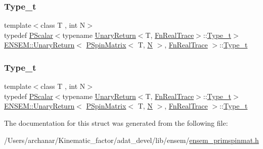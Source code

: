 \subsubsection{\texorpdfstring{Type\_t}{Type\_t}\hspace{0.1cm}{\footnotesize\ttfamily [1/2]}}
{\footnotesize\ttfamily template$<$class T , int N$>$ \\
typedef \mbox{\hyperlink{classENSEM_1_1PScalar}{P\+Scalar}}$<$typename \mbox{\hyperlink{structENSEM_1_1UnaryReturn}{Unary\+Return}}$<$T, \mbox{\hyperlink{structENSEM_1_1FnRealTrace}{Fn\+Real\+Trace}}$>$\+::\mbox{\hyperlink{structENSEM_1_1UnaryReturn_3_01PSpinMatrix_3_01T_00_01N_01_4_00_01FnRealTrace_01_4_a7a7a0fb32831cb5d3323377a17f96cdd}{Type\+\_\+t}}$>$ \mbox{\hyperlink{structENSEM_1_1UnaryReturn}{E\+N\+S\+E\+M\+::\+Unary\+Return}}$<$ \mbox{\hyperlink{classENSEM_1_1PSpinMatrix}{P\+Spin\+Matrix}}$<$ T, \mbox{\hyperlink{operator__name__util_8cc_a7722c8ecbb62d99aee7ce68b1752f337}{N}} $>$, \mbox{\hyperlink{structENSEM_1_1FnRealTrace}{Fn\+Real\+Trace}} $>$\+::\mbox{\hyperlink{structENSEM_1_1UnaryReturn_3_01PSpinMatrix_3_01T_00_01N_01_4_00_01FnRealTrace_01_4_a7a7a0fb32831cb5d3323377a17f96cdd}{Type\+\_\+t}}}

\mbox{\label{structENSEM_1_1UnaryReturn_3_01PSpinMatrix_3_01T_00_01N_01_4_00_01FnRealTrace_01_4_a7a7a0fb32831cb5d3323377a17f96cdd}} 
\subsubsection{\texorpdfstring{Type\_t}{Type\_t}\hspace{0.1cm}{\footnotesize\ttfamily [2/2]}}
{\footnotesize\ttfamily template$<$class T , int N$>$ \\
typedef \mbox{\hyperlink{classENSEM_1_1PScalar}{P\+Scalar}}$<$typename \mbox{\hyperlink{structENSEM_1_1UnaryReturn}{Unary\+Return}}$<$T, \mbox{\hyperlink{structENSEM_1_1FnRealTrace}{Fn\+Real\+Trace}}$>$\+::\mbox{\hyperlink{structENSEM_1_1UnaryReturn_3_01PSpinMatrix_3_01T_00_01N_01_4_00_01FnRealTrace_01_4_a7a7a0fb32831cb5d3323377a17f96cdd}{Type\+\_\+t}}$>$ \mbox{\hyperlink{structENSEM_1_1UnaryReturn}{E\+N\+S\+E\+M\+::\+Unary\+Return}}$<$ \mbox{\hyperlink{classENSEM_1_1PSpinMatrix}{P\+Spin\+Matrix}}$<$ T, \mbox{\hyperlink{operator__name__util_8cc_a7722c8ecbb62d99aee7ce68b1752f337}{N}} $>$, \mbox{\hyperlink{structENSEM_1_1FnRealTrace}{Fn\+Real\+Trace}} $>$\+::\mbox{\hyperlink{structENSEM_1_1UnaryReturn_3_01PSpinMatrix_3_01T_00_01N_01_4_00_01FnRealTrace_01_4_a7a7a0fb32831cb5d3323377a17f96cdd}{Type\+\_\+t}}}



The documentation for this struct was generated from the following file\+:\begin{DoxyCompactItemize}
\item 
/\+Users/archanar/\+Kinematic\+\_\+factor/adat\+\_\+devel/lib/ensem/\mbox{\hyperlink{lib_2ensem_2ensem__primspinmat_8h}{ensem\+\_\+primspinmat.\+h}}\end{DoxyCompactItemize}
